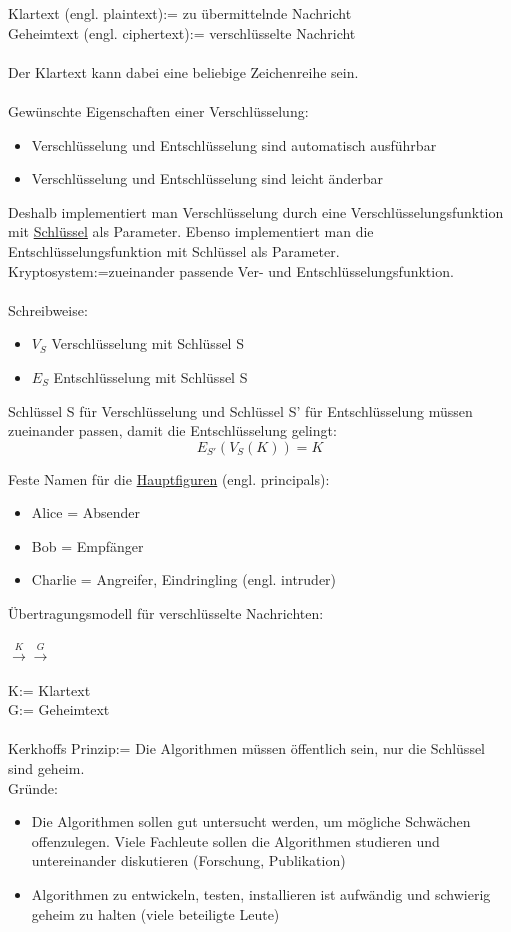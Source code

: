 \documentclass[a4paper,12pt]{article}
\begin{document}
Klartext (engl. plaintext):= zu übermittelnde Nachricht\\
Geheimtext (engl. ciphertext):= verschlüsselte Nachricht\\
\\
Der Klartext kann dabei eine beliebige Zeichenreihe sein.\\
\\
Gewünschte Eigenschaften einer Verschlüsselung:
\begin{itemize}
 \item Verschlüsselung und Entschlüsselung sind automatisch ausführbar
 \item Verschlüsselung und Entschlüsselung sind leicht änderbar
\end{itemize}

Deshalb implementiert man Verschlüsselung durch eine Verschlüsselungsfunktion mit \underline{Schlüssel} als Parameter. Ebenso implementiert man die Entschlüsselungsfunktion mit Schlüssel als Parameter.\
\\
Kryptosystem:=zueinander passende Ver- und Entschlüsselungsfunktion.\\
\\
Schreibweise:
\begin{itemize}
 \item $V_S$ Verschlüsselung mit Schlüssel S
 \item $E_S$ Entschlüsselung mit Schlüssel S
\end{itemize}
Schlüssel S für Verschlüsselung und Schlüssel S' für Entschlüsselung müssen zueinander passen, damit die Entschlüsselung gelingt:
$$E_{S'}(V_S(K))=K$$

Feste Namen für die \underline{Hauptfiguren} (engl. principals):
\begin{itemize}
 \item Alice = Absender
 \item Bob = Empfänger
 \item Charlie = Angreifer, Eindringling (engl. intruder)
\end{itemize}

Übertragungsmodell für verschlüsselte Nachrichten:\\
\\
$\xrightarrow{K}$$\xrightarrow{G}$\\
\\
K:= Klartext\\
G:= Geheimtext\\
\\
Kerkhoffs Prinzip:= Die Algorithmen müssen öffentlich sein, nur die Schlüssel sind geheim.\\
Gründe:
\begin{itemize}
 \item Die Algorithmen sollen gut untersucht werden, um mögliche Schwächen offenzulegen. Viele Fachleute sollen die Algorithmen studieren und untereinander diskutieren (Forschung, Publikation)
 \item Algorithmen zu entwickeln, testen, installieren ist aufwändig und schwierig geheim zu halten (viele beteiligte Leute)
\end{itemize}
\end{document}
